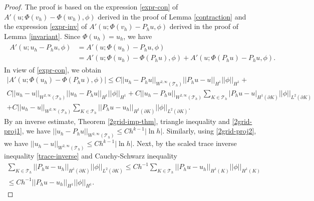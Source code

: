 \documentclass[12pt]{amsart}
\numberwithin{equation}{section}
\begin{document}
\begin{proof} The proof is based on the expression \eqref{expr-con} of $A'(u;\Phi( v_h)- \Phi( w_h),\phi)$ derived in the proof of Lemma \ref{contraction} and the expression \eqref{expr-inv} of $A'(u; \Phi( v_h)- P_h u,\phi )$ derived in the proof of Lemma \ref{invariant}. 
Since $\Phi(u_h) = u_h$, we have
\begin{align} \label{u-p-01}
\begin{split}
A'(u; u_h - P_h u,\phi) & = A'(u; \Phi(u_h) - P_h u,\phi) \\
& =  A'(u; \Phi(u_h) - \Phi(P_h u),\phi)  +  A'(u; \Phi(P_h u) - P_h u,\phi). 
\end{split}
\end{align}
In view of \eqref{expr-con}, we obtain %
\begin{multline} \label{u-p-02}
| A'(u; \Phi(u_h) - \Phi(P_h u),\phi)| \leq C  ||u_h-P_h u ||_{W^{2,\infty}(\mathcal{T}_h)}  ||P_h u-u ||_{H^{1}} ||\phi||_{H^1} + \\
C ||u_h- u ||_{W^{2,\infty}(\mathcal{T}_h)}  || u_h- P_h u ||_{H^{1}} ||\phi||_{H^1} + C  ||u_h-P_h u ||_{W^{2,\infty}(\mathcal{T}_h)} 
\sum_{K \in \mathcal{T}_h } | P_h u - u |_{H^{1}(\partial K)} ||\phi||_{L^2(\partial K)} \\
+  C  ||u_h- u ||_{W^{2,\infty}(\mathcal{T}_h)} 
\sum_{K \in \mathcal{T}_h } || P_h u - u_h ||_{H^{1}(\partial K)} ||\phi||_{L^2(\partial K)}.
\end{multline}
By an inverse estimate, Theorem \ref{2grid-imp-thm}, triangle inequality and \eqref{2grid-proj1}, we have $||u_h-P_h u ||_{W^{2,\infty}(\mathcal{T}_h)} \leq
C h^{k-1} | \ln h| $. Similarly, using \eqref{2grid-proj2}, we have $||u_h- u ||_{W^{2,\infty}(\mathcal{T}_h)} \leq C h^{k-1} | \ln h|$.  
Next, by the scaled trace inverse inequality \eqref{trace-inverse} %
and Cauchy-Schwarz inequality
\begin{multline} \label{u-p-03}
 \sum_{K \in \mathcal{T}_h } || P_h u - u_h ||_{H^{1}(\partial K)} ||\phi||_{L^2(\partial K)}  \leq C h^{-1} 
  \sum_{K \in \mathcal{T}_h } || P_h u - u_h ||_{H^{1}( K)} ||\phi||_{H^1( K)} \\
    \leq C h^{-1}  || P_h u - u_h ||_{H^{1}} ||\phi||_{H^1}.
\end{multline}


\end{proof}
\end{document}
